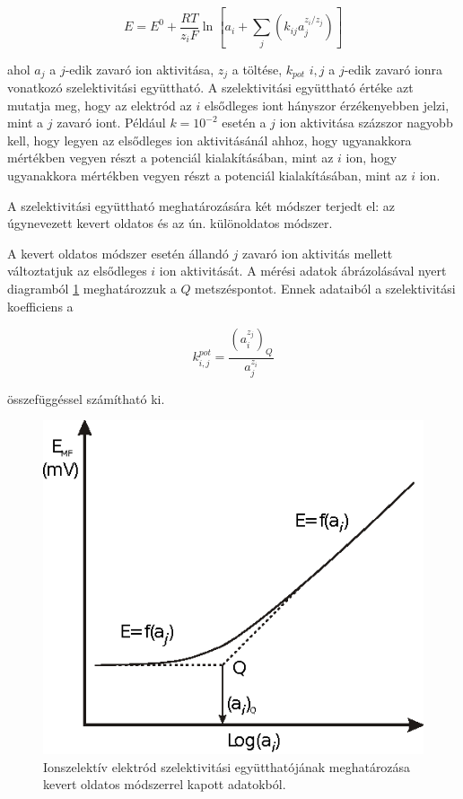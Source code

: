 \begin{equation}
\label{eq:nikolsky}
E=E^0 + \frac{RT}{z_iF} \ln \left [ a_i + \sum_{j} \left ( k_{ij}a_j^{z_i/z_j} \right ) \right ]
\end{equation}

ahol $a_j$ a $j$-edik zavaró ion aktivitása, $z_j$ a töltése, $k_{pot}$ $i, j$ a $j$-edik zavaró ionra vonatkozó szelektivitási együttható.
A szelektivitási együttható értéke azt mutatja meg, hogy az elektród az $i$ elsődleges iont hányszor érzékenyebben jelzi, mint a $j$ zavaró iont.
Például $k = 10^{-2}$ esetén a $j$ ion aktivitása százszor nagyobb kell, hogy legyen az elsődleges ion aktivitásánál ahhoz, hogy ugyanakkora mértékben vegyen részt a potenciál kialakításában, mint az $i$ ion, hogy ugyanakkora mértékben vegyen részt a potenciál kialakításában, mint az $i$ ion.

A szelektivitási együttható meghatározására két módszer terjedt el: az úgynevezett kevert oldatos és az ún. különoldatos módszer.

A kevert oldatos módszer esetén állandó $j$ zavaró ion aktivitás mellett változtatjuk az elsődleges $i$ ion aktivitását.
A mérési adatok ábrázolásával nyert diagramból \ref{fig:Q} meghatározzuk a $Q$ metszéspontot.
Ennek adataiból a szelektivitási koefficiens a

\begin{equation}
\label{eq:szel1}
	k_{i,j}^{pot}
	=
	\frac{(a_i^{z_j})_Q}{a_j^{z_i}}
\end{equation}

összefüggéssel számítható ki.

\begin{figure}
\centering
\includegraphics{fig/ion1.eps}
\caption{Ionszelektív elektród szelektivitási együtthatójának meghatározása kevert oldatos módszerrel kapott adatokból.}
\label{fig:Q}
\end{figure}

